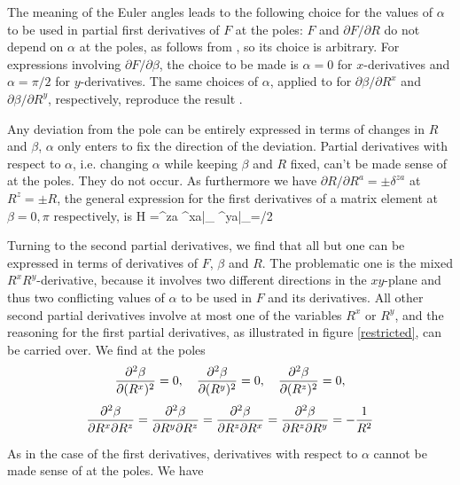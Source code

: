\par{The meaning of the Euler angles leads to the following choice for the values of $\alpha$ to be used in
partial first derivatives of $F$ at the poles:
$F$ and $\partial F / \partial R$ do not depend on $\alpha$ at the poles, as follows from ,
so its choice is arbitrary.
For expressions involving $\partial F / \partial \beta$, the choice to be made is
$\alpha=0$ for $x$-derivatives and $\alpha=\pi/2$ for $y$-derivatives. The same choices of $\alpha$,
applied to  for $\partial \beta / \partial R^{x}$ and $\partial \beta / \partial R^{y}$,
respectively, reproduce the result .}
\par{Any deviation from the pole can be entirely expressed in terms of changes in $R$ and $\beta$, $\alpha$
only enters to fix the direction of the deviation. Partial derivatives with respect to $\alpha$, i.e.
changing $\alpha$ while keeping $\beta$ and $R$ fixed, can't be made sense of at the poles. They do not occur.
As furthermore we have $\partial R/\partial R^{a}=\pm \delta^{za}$ at $R^{z}=\pm R$, the general
expression for the first derivatives of a matrix element at $\beta=0,\pi$ respectively, is}
\be
\label{PoleFirst}
 H =\pm \delta^{za}
\pm \delta^{xa}\biggl|_{}
\pm \delta^{ya}\biggl|_{\alpha=\pi/2}
\ee
%
\par{Turning to the second partial derivatives, we find that all but one can be expressed in terms of
derivatives of $F$, $\beta$ and $R$. The problematic one is the mixed $R^{x}R^{y}$-derivative,
because it involves two different directions in the $xy$-plane and thus two conflicting values
of $\alpha$ to be used in $F$ and its derivatives. All other second partial derivatives involve at
most one of the variables $R^{x}$ or $R^{y}$, and the reasoning for the first partial derivatives, as
illustrated in figure \ref{restricted}, can be carried over.
We find at the poles}
\begin{displaymath}
\frac{\partial^{2} \beta}{\partial (R^{x})^{2}}=0,\quad \frac{\partial^{2} \beta}{\partial (R^{y})^{2}}=0,\quad \frac{\partial^{2} \beta}{\partial (R^{z})^{2}}=0,
\end{displaymath}
\begin{displaymath}
\frac{\partial^{2} \beta}{\partial R^{x} \partial R^{z}}=\frac{\partial^{2} \beta}{\partial R^{y} \partial R^{z}}=\frac{\partial^{2} \beta}{\partial R^{z} \partial R^{x}}=\frac{\partial^{2} \beta}{\partial R^{z} \partial R^{y}}=
-\frac{1}{R^{2}}
\end{displaymath}
\par{As in the case of the first derivatives, derivatives with respect to $\alpha$ cannot be made sense
of at the poles.
We have}
